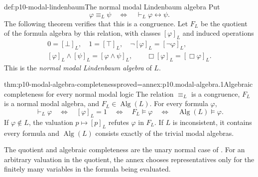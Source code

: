 \begin{hbdefinition}{def:p10-modal-lindenbaum}{The normal modal Lindenbaum algebra}
Put
\[
 \varphi\equiv_L\psi
       \quad\Longleftrightarrow\quad
       \vdash_L\varphi\leftrightarrow\psi.
\]
The following theorem verifies that this is a congruence.
Let \(F_L\) be the quotient of the formula algebra by this relation,
with classes \([\varphi]_L\) and induced operations
\[
\begin{gathered}
 0=[\bot]_L,\quad 1=[\top]_L,\quad
 \neg[\varphi]_L=[\neg\varphi]_L,\\
 [\varphi]_L\wedge[\psi]_L=[\varphi\wedge\psi]_L,\qquad
 \Box[\varphi]_L=[\Box\varphi]_L.
\end{gathered}
\]
This is the \emph{normal modal Lindenbaum algebra} of \(L\).
\end{hbdefinition}

\begin{hbtheorem}{thm:p10-modal-algebra-completeness}{proved=annex:p10.modal-algebra.1}{Algebraic completeness for every normal modal logic}
The relation \(\equiv_L\) is a congruence, \(F_L\) is a normal
modal algebra, and \(F_L\in\operatorname{Alg}(L)\).
For every formula \(\varphi\),
\[
 \vdash_L\varphi
 \quad\Longleftrightarrow\quad
 [\varphi]_L=1
 \quad\Longleftrightarrow\quad
 F_L\models\varphi
 \quad\Longleftrightarrow\quad
 \operatorname{Alg}(L)\models\varphi.
\]
If \(\varphi\notin L\), the valuation \(p\mapsto[p]_L\)
refutes \(\varphi\) in \(F_L\).
If \(L\) is inconsistent, it contains every formula and
\(\operatorname{Alg}(L)\) consists exactly of the trivial modal
algebras.
\end{hbtheorem}

The quotient and algebraic completeness are the unary normal case of
\cite[Definitions~3.14 and~3.16, Proposition~3.15, and
Theorems~3.13 and~3.17, pp.~10--11]{Venema2005Preprint}.
For an arbitrary valuation in the quotient, the annex chooses
representatives only for the finitely many variables in the formula
being evaluated.

